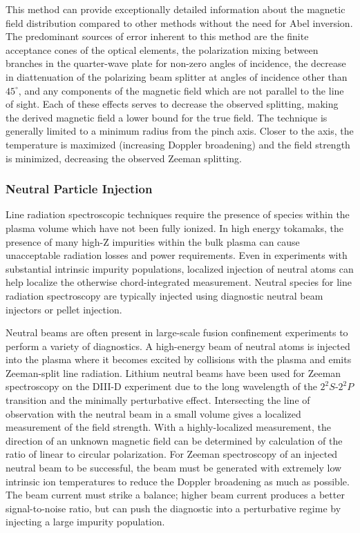 \documentclass{jpp}
\begin{document}
This method can provide exceptionally detailed information about the magnetic field distribution compared to other methods without the need for Abel inversion. The predominant sources of error inherent to this method are the finite acceptance cones of the optical elements, the polarization mixing between branches in the quarter-wave plate for non-zero angles of incidence, the decrease in diattenuation of the polarizing beam splitter at angles of incidence other than $45^\circ$, and any components of the magnetic field which are not parallel to the line of sight. Each of these effects serves to decrease the observed splitting, making the derived magnetic field a lower bound for the true field. The technique is generally limited to a minimum radius from the pinch axis. Closer to the axis, the temperature is maximized (increasing Doppler broadening) and the field strength is minimized, decreasing the observed Zeeman splitting.


\subsubsection{Neutral Particle Injection}

Line radiation spectroscopic techniques require the presence of species within the plasma volume which have not been fully ionized. In high energy tokamaks, the presence of many high-Z impurities within the bulk plasma can cause unacceptable radiation losses and power requirements. Even in experiments with substantial intrinsic impurity populations, localized injection of neutral atoms can help localize the otherwise chord-integrated measurement. Neutral species for line radiation spectroscopy are typically injected using diagnostic neutral beam injectors or pellet injection.

Neutral beams are often present in large-scale fusion confinement experiments to perform a variety of diagnostics. A high-energy beam of neutral atoms is injected into the plasma where it becomes excited by collisions with the plasma and emits Zeeman-split line radiation. Lithium neutral beams have been used for Zeeman spectroscopy on the DIII-D experiment \citep{doi:10.1063/1.1526928} due to the long wavelength of the $2^2S$-$2^2P$ transition and the minimally perturbative effect. Intersecting the line of observation with the neutral beam in a small volume gives a localized measurement of the field strength. With a highly-localized measurement, the direction of an unknown magnetic field can be determined by calculation of the ratio of linear to circular polarization. For Zeeman spectroscopy of an injected neutral beam to be successful, the beam must be generated with extremely low intrinsic ion temperatures to reduce the Doppler broadening as much as possible. The beam current must strike a balance; higher beam current produces a better signal-to-noise ratio, but can push the diagnostic into a perturbative regime by injecting a large impurity population.
\end{document}
